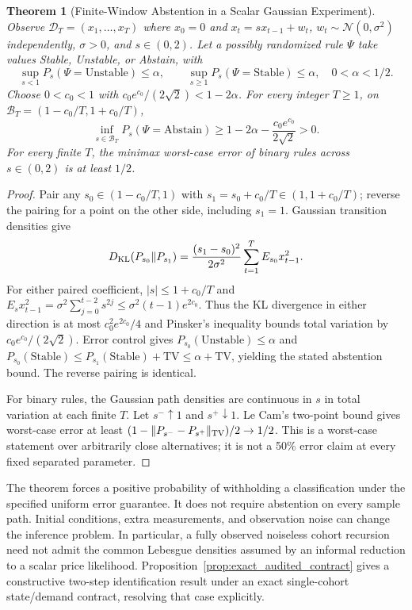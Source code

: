 \documentclass[12pt]{article}
\newtheorem{theorem}{Theorem}[section]
\theoremstyle{definition}
\theoremstyle{remark}
\begin{document}
\begin{theorem}[Finite-Window Abstention in a Scalar Gaussian Experiment]
\label{thm:m3_minimax_abstention}
Observe $\mathcal D_T=(x_1,\ldots,x_T)$ where $x_0=0$ and $x_t=sx_{t-1}+w_t$, $w_t\sim\mathcal N(0,\sigma^2)$ independently, $\sigma>0$, and $s\in(0,2)$. Let a possibly randomized rule $\Psi$ take values Stable, Unstable, or Abstain, with
\[
\sup_{s<1}P_s(\Psi=\mathrm{Unstable})\le\alpha,
\qquad \sup_{s\ge1}P_s(\Psi=\mathrm{Stable})\le\alpha,
\quad 0<\alpha<1/2.
\]
Choose $0<c_0<1$ with $c_0e^{c_0}/(2\sqrt2)<1-2\alpha$. For every integer $T\ge1$, on $\mathcal B_T=(1-c_0/T,1+c_0/T)$,
\begin{equation}
\inf_{s\in\mathcal B_T}P_s(\Psi=\mathrm{Abstain})
\ge1-2\alpha-\frac{c_0e^{c_0}}{2\sqrt2}>0.
\label{eq:abstain_bound}
\end{equation}
For every finite $T$, the minimax worst-case error of binary rules across $s\in(0,2)$ is at least $1/2$.
\end{theorem}
\begin{proof}
Pair any $s_0\in(1-c_0/T,1)$ with $s_1=s_0+c_0/T\in(1,1+c_0/T)$; reverse the pairing for a point on the other side, including $s_1=1$. Gaussian transition densities give
\[
D_{\rm KL}(P_{s_0}\|P_{s_1})
=\frac{(s_1-s_0)^2}{2\sigma^2}\sum_{t=1}^T E_{s_0}x_{t-1}^2.
\]
For either paired coefficient, $|s|\le1+c_0/T$ and
$E_sx_{t-1}^2=\sigma^2\sum_{j=0}^{t-2}s^{2j}\le\sigma^2(t-1)e^{2c_0}$.
Thus the KL divergence in either direction is at most $c_0^2e^{2c_0}/4$ and Pinsker's inequality bounds total variation by $c_0e^{c_0}/(2\sqrt2)$. Error control gives $P_{s_0}(\mathrm{Unstable})\le\alpha$ and $P_{s_0}(\mathrm{Stable})\le P_{s_1}(\mathrm{Stable})+\mathrm{TV}\le\alpha+\mathrm{TV}$, yielding the stated abstention bound. The reverse pairing is identical.

For binary rules, the Gaussian path densities are continuous in $s$ in total variation at each finite $T$. Let $s^-\uparrow1$ and $s^+\downarrow1$. Le Cam's two-point bound gives worst-case error at least $(1-\|P_{s^-}-P_{s^+}\|_{\rm TV})/2\to1/2$. This is a worst-case statement over arbitrarily close alternatives; it is not a 50\% error claim at every fixed separated parameter.
\end{proof}

The theorem forces a positive probability of withholding a classification under the specified uniform error guarantee. It does not require abstention on every sample path. Initial conditions, extra measurements, and observation noise can change the inference problem. In particular, a fully observed noiseless cohort recursion need not admit the common Lebesgue densities assumed by an informal reduction to a scalar price likelihood. Proposition~\ref{prop:exact_audited_contract} gives a constructive two-step identification result under an exact single-cohort state/demand contract, resolving that case explicitly.
\end{document}
